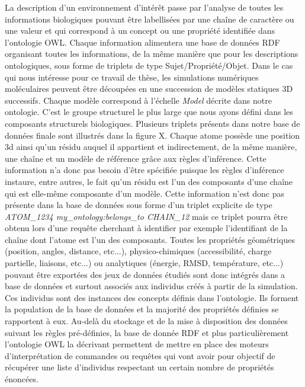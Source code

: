 La description d'un environnement d'intérêt passe par l'analyse de toutes les informations biologiques pouvant être labellisées par une chaîne de caractère ou une valeur et qui correspond à un concept ou une propriété identifiée dans l'ontologie OWL. Chaque information alimentera une base de données RDF organisant toutes les informations, de la même manière que pour les descriptions ontologiques, sous forme de triplets de type Sujet/Propriété/Objet.
Dans le cas qui nous intéresse pour ce travail de thèse, les simulations numériques moléculaires peuvent être découpées en une succession de modèles statiques 3D successifs. Chaque modèle correspond à l'échelle \textit{Model} décrite dans notre ontologie. C'est le groupe structurel le plus large que nous ayons défini dans les composants structurels biologiques. Plusieurs triplets présents dans notre base de données finale sont illustrés dans la figure X. Chaque atome possède une position 3d ainsi qu'un résidu auquel il appartient et indirectement, de la même manière, une chaîne et un modèle de référence grâce aux règles d'inférence. Cette information n'a donc pas besoin d'être spécifiée puisque les règles d'inférence instaure, entre autres, le fait qu'un résidu est l'un des composants d'une chaîne qui est elle-même composante d'un modèle. Cette information n'est donc pas présente dans la base de données sous forme d'un triplet explicite de type \textit{ATOM\_1234 my\_ontology:belongs\_to CHAIN\_12} mais ce triplet pourra être obtenu lors d'une requête cherchant à identifier par exemple l'identifiant de la chaîne dont l'atome est l'un des composants. Toutes les propriétés géométriques (position, angles, distance, etc...), physico-chimiques (accessibilité, charge partielle, liaisons, etc...) ou analytiques (énergie, RMSD, température, etc...) pouvant être exportées des jeux de données étudiés sont donc intégrés dans a base de données et surtout associés aux individus créés à partir de la simulation. Ces individus sont des instances des concepts définis dans l'ontologie. Ils forment la population de la base de données et la majorité des propriétés définies se rapportent à eux.
Au-delà du stockage et de la mise à disposition des données suivant les règles pré-définies, la base de donnée RDF et plus particulièrement l'ontologie OWL la décrivant permettent de mettre en place des moteurs d'interprétation de commandes ou requêtes qui vont avoir pour objectif de récupérer une liste d'individus respectant un certain nombre de propriétés énoncées.

